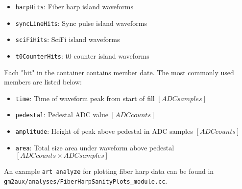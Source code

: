 \begin{itemize}
\item \verb+harpHits+: Fiber harp island waveforms
\item \verb+syncLineHits+: Sync pulse island waveforms
\item \verb+sciFiHits+: SciFi island waveforms
\item \verb+t0CounterHits+: t0 counter island waveforms
\end{itemize}

Each "hit" in the container contains member date. The most commonly used members are listed below:

\begin{itemize}
\item \verb+time+: Time of waveform peak from start of fill $[ADC samples]$
\item \verb+pedestal+: Pedestal ADC value $[ADC counts]$
\item \verb+amplitude+: Height of peak above pedestal in ADC samples $[ADC counts]$
\item \verb+area+: Total size area under waveform above pedestal $[ADC counts \times ADC samples]$
\end{itemize}

An example \verb+art analyze+ for plotting fiber harp data can be found in \verb+gm2aux/analyses/FiberHarpSanityPlots_module.cc+.





